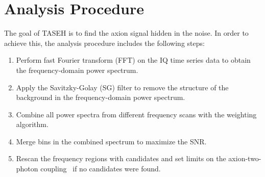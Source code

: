 \section{Analysis Procedure} \label{sec:ana}
The goal of TASEH is to find the axion signal hidden in the noise. In 
order to achieve this, the analysis procedure includes the following steps:
    \begin{enumerate}
        \item Perform fast Fourier transform (FFT) on the 
IQ time series data to obtain the frequency-domain power spectrum.
        \item Apply the Savitzky-Golay (SG) filter to remove the structure 
of the background in the frequency-domain power spectrum.
        \item Combine all power spectra from different frequency scans with 
the weighting algorithm.
        \item Merge bins in the combined spectrum to maximize the SNR. 
       \item Rescan the frequency regions with candidates and set limits on 
      the axion-two-photon coupling \gagg\ if no candidates were found.
    \end{enumerate}

